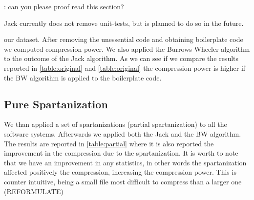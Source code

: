 \matteo: can  you please proof read this section?

Jack currently does not remove unit-tests, but is planned to do so in the
future.

 our dataset. After removing the unessential code and
obtaining boilerplate code we computed compression power. We also applied the
Burrows-Wheeler algorithm to the outcome of the Jack algorithm. As we can see
if we compare the results reported in \cref{table:original} and
\cref{table:original} the compression power is higher if the BW algorithm is
applied to the boilerplate code.


\begin{table}
  \caption{Aggregating statistics of compression power of
    Jack alone and Jack and BZip2.}
  \label{table:original}
  \par\vspace{10pt plus 6pt minus 4pt}
  \centering
\end{table}

\subsection{Pure Spartanization}

We than applied a set of spartanizations (partial spartanization) to all the
software systems. Afterwards we applied both the Jack and the BW algorithm.
The results are reported in \cref{table:partial} where it is also
reported the improvement in the compression due to the spartanization. It is
worth to note that we have an improvement in any statistics, in other words the
spartanization affected positively the compression, increasing the compression
power. This is counter intuitive, being a small file most difficult to
compress than a larger one (REFORMULATE)

